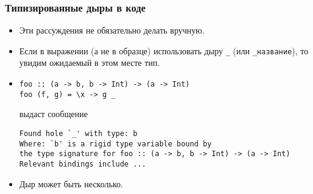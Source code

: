 \documentclass[10pt]{beamer}
\begin{document}
\begin{frame}[fragile]
  \frametitle{Типизированные дыры в коде}
  \begin{itemize}
    \item Эти рассуждения не обязательно делать вручную.
    \item Если в выражении (а не в образце) использовать дыру \lstinline|_| (или \lstinline|_название|), то увидим ожидаемый в этом месте тип.
    \item
          \begin{lstlisting}
foo :: (a -> b, b -> Int) -> (a -> Int)
foo (f, g) = \x -> g _
\end{lstlisting}
          выдаст сообщение
          \begin{lstlisting}
Found hole `_' with type: b
Where: `b' is a rigid type variable bound by
the type signature for foo :: (a -> b, b -> Int) -> (a -> Int)
Relevant bindings include ...
\end{lstlisting}
    \item Дыр может быть несколько.
  \end{itemize}
\end{frame}
\end{document}
